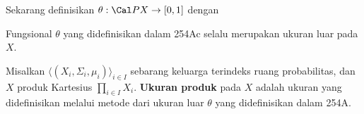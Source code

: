  Sekarang definisikan $\theta:\Cal PX\to[0,1]$ dengan


 Fungsional $\theta$ yang didefinisikan dalam 254Ac selalu
merupakan ukuran luar pada $X$.


 Misalkan
$\langle(X_i,\Sigma_i,\mu_i)\rangle_{i\in I}$ sebarang keluarga terindeks
ruang probabilitas, dan $X$ produk Kartesius
$\prod_{i\in I}X_i$. {\bf Ukuran produk} pada $X$ adalah ukuran yang
didefinisikan melalui metode \Caratheodory{} dari
ukuran luar $\theta$ yang didefinisikan dalam 254A.

